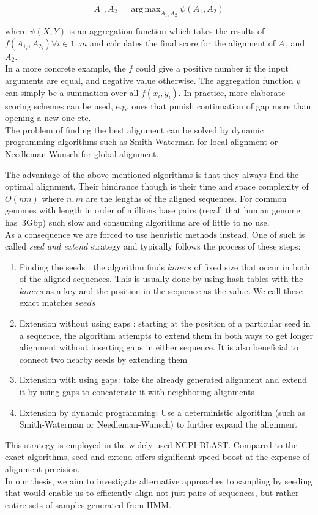$$A_1, A_2 = \operatorname{arg\,max}_{A_1, A_2} \psi(A_1, A_2)$$

where $\psi(X,Y)$ is an aggregation function which takes the results of $f(A_{1_i},A_{2_i}) \forall i \in {1..m}$ and calculates the final score for the alignment of $A_1$ and $A_2$.\\

In a more concrete example, the $f$ could give a positive number if the input arguments are equal, and negative value otherwise. The aggregation function $\psi$ can simply be a summation over all $f(x_i, y_i)$. In practice, more elaborate scoring schemes can be used, e.g. ones that punish continuation of gap more than opening a new one etc.\\ 

The problem of finding the best alignment can be solved by dynamic programming algorithms such as Smith-Waterman for local alignment or Needleman-Wunsch for global alignment.

The advantage of the above mentioned algorithms is that they always find the optimal alignment. Their hindrance though is their time and space complexity of $O(nm)$ where $n,m$ are the lengths of the aligned sequences. For common genomes with length in order of millions base pairs (recall that human genome has $~$3Gbp) such slow and consuming algorithms are of little to no use.\\

As a consequence we are forced to use heuristic methods instead. One of such is called \emph{seed and extend} strategy and typically follows the process of these steps:
\begin{enumerate}
	\item{Finding the seeds : the algorithm finds $kmers$ of fixed size that occur in both of the aligned sequences. This is usually done by using hash tables with the $kmers$ as a key and the position in the sequence as the value. We call these exact matches $seeds$}
	\item{Extension without using gaps : starting at the position of a particular seed in a sequence, the algorithm attempts to extend them in both ways to get longer alignment without inserting gaps in either sequence. It is also beneficial to connect two nearby seeds by extending them}
	\item{Extension with using gaps: take the already generated alignment and extend it by using gaps to concatenate it with neighboring alignments}
	\item{Extension by dynamic programming: Use a deterministic algorithm (such as Smith-Waterman or Needleman-Wunsch) to further expand the alignment}
\end{enumerate}

This strategy is employed in the widely-used NCPI-BLAST. Compared to the exact algorithms, seed and extend offers significant speed boost at the expense of alignment precision.\\

In our thesis, we aim to investigate alternative approaches to sampling by seeding that would enable us to efficiently align not just pairs of sequences, but rather entire sets of samples generated from HMM.
